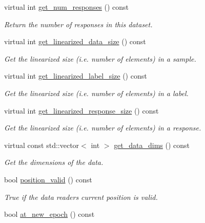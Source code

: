 \begin{DoxyCompactItemize}
virtual int \hyperlink{classlbann_1_1generic__data__reader_a054be9375a6e8338c893230f83c1497f}{get\+\_\+num\+\_\+responses} () const
\begin{DoxyCompactList}\small\item\em Return the number of responses in this dataset. \end{DoxyCompactList}\item 
virtual int \hyperlink{classlbann_1_1generic__data__reader_a246a719477c8c7b6122d41b6f5618d41}{get\+\_\+linearized\+\_\+data\+\_\+size} () const
\begin{DoxyCompactList}\small\item\em Get the linearized size (i.\+e. number of elements) in a sample. \end{DoxyCompactList}\item 
virtual int \hyperlink{classlbann_1_1generic__data__reader_a99e8ba4f09fdc86d238ad7c8d2e2bce0}{get\+\_\+linearized\+\_\+label\+\_\+size} () const
\begin{DoxyCompactList}\small\item\em Get the linearized size (i.\+e. number of elements) in a label. \end{DoxyCompactList}\item 
virtual int \hyperlink{classlbann_1_1generic__data__reader_aacd8704cd11ed6f521cebeaac06c6cb7}{get\+\_\+linearized\+\_\+response\+\_\+size} () const
\begin{DoxyCompactList}\small\item\em Get the linearized size (i.\+e. number of elements) in a response. \end{DoxyCompactList}\item 
virtual const std\+::vector$<$ int $>$ \hyperlink{classlbann_1_1generic__data__reader_ae06ff27459ac4a5d8ac14655d4b31318}{get\+\_\+data\+\_\+dims} () const
\begin{DoxyCompactList}\small\item\em Get the dimensions of the data. \end{DoxyCompactList}\item 
bool \hyperlink{classlbann_1_1generic__data__reader_a2b10538440d784f0f12582a5407acef2}{position\+\_\+valid} () const
\begin{DoxyCompactList}\small\item\em True if the data reader\textquotesingle{}s current position is valid. \end{DoxyCompactList}\item 
bool \hyperlink{classlbann_1_1generic__data__reader_a5ef5acf32117e5b2ea1a366e071e21d4}{at\+\_\+new\+\_\+epoch} () const

\end{DoxyCompactItemize}
